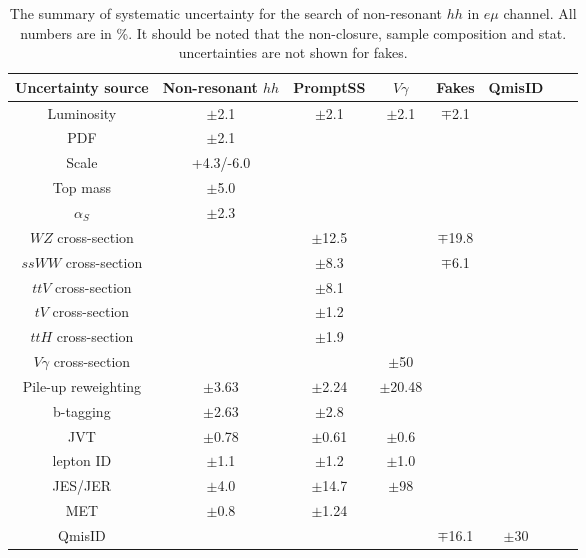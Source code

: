 \begin{table}[h]
\begin{center}
\begin{tabular}{c|ccc|cccc}
\hline
Uncertainty source  &Non-resonant $hh$  &PromptSS &$V\gamma$ &Fakes &QmisID\\
\hline
Luminosity &$\pm$2.1 &$\pm$2.1 &$\pm$2.1 &$\mp$2.1  &\multirow{ 16}{*}{}\\
\hline
PDF  &$\pm$2.1  &   & &\multirow{ 3}{*}{}\\
Scale &+4.3/-6.0 & & &\\
Top mass &$\pm$5.0 & & &\\
$\alpha_S$ &$\pm$2.3 & & &\\
\hline
$WZ$ cross-section  & &$\pm$12.5 & &$\mp$19.8\\
$ssWW$ cross-section & &$\pm$8.3 & &$\mp$6.1\\
$ttV$ cross-section & &$\pm$8.1 & &\\
$tV$ cross-section & &$\pm$1.2 &  &\\
$ttH$ cross-section & &$\pm$1.9 & & \\
$V\gamma$ cross-section & & &$\pm$50 &\\
\hline
Pile-up reweighting &$\pm$3.63 &$\pm$2.24 &$\pm$20.48 &\multirow{ 5}{*}{}\\
b-tagging &$\pm$2.63 &$\pm$2.8 & &\\
JVT &$\pm$0.78 &$\pm$0.61  &$\pm$0.6 &\\
lepton ID &$\pm$1.1 &$\pm$1.2 &$\pm$1.0 &\\
\cline{1-4}
JES/JER &$\pm$4.0 & $\pm$14.7 &$\pm$98 &\\
\cline{1-4}
MET &$\pm$0.8 &$\pm$1.24 & &\\
\hline
QmisID &  &  &  &$\mp$16.1 &$\pm$30\\
\hline
\end{tabular}
\caption{The summary of systematic uncertainty for the search of non-resonant $hh$ in $e\mu$ channel. All numbers are in \%. It should be noted that the non-closure, sample composition and stat. uncertainties are not shown for fakes.}
\label{tab:summary_syst_ee_nonres}
\end{center}
\end{table}